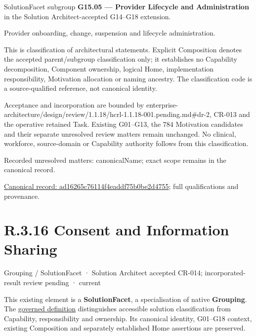SolutionFacet subgroup \textbf{G15.05 — Provider Lifecycle and Administration} in the Solution Architect-accepted G14–G18 extension.



Provider onboarding, change, suspension and lifecycle administration.



This is classification of architectural statements. Explicit Composition denotes the accepted parent/subgroup classification only; it establishes no Capability decomposition, Component ownership, logical Home, implementation responsibility, Motivation allocation or naming ancestry. The classification code is a source-qualified reference, not canonical identity.



Acceptance and incorporation are bounded by enterprise-architecture/design/review/1.1.18/hcrl-1.1.18-001.pending.md\#dr-2, CR-013 and the operative retained Task. Existing G01–G13, the 784 Motivation candidates and their separate unresolved review matters remain unchanged. No clinical, workforce, source-domain or Capability authority follows from this classification.


{\small Recorded unresolved matters: canonicalName; exact scope remains in the canonical record.}\par
{\footnotesize \href{../../../../../../../continuum/grouping/ad16265c76114f4eaddf75b0be2d4755.md}{Canonical record: ad16265c76114f4eaddf75b0be2d4755}; full qualifications and provenance.}\par
\section*{R.3.16 Consent and Information Sharing}
\label{navigation:R.3.16}

\label{element:abca473311ea40aca58756d859077ff7}
{\small Grouping / SolutionFacet · Solution Architect accepted CR-014; incorporated-result review pending · current}\par

This existing element is a \textbf{SolutionFacet}, a specialisation of native
\textbf{Grouping}. The \href{\detokenize{../../../../../../../governance/continuum-representation.md#solutionfacet-classification--1119-candidate}}{governed definition}
distinguishes accessible solution classification from Capability, responsibility
and ownership. Its canonical identity, G01–G18 context, existing Composition
and separately established Home assertions are preserved.



